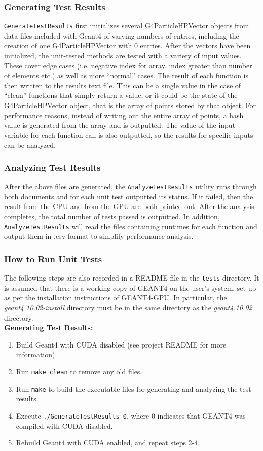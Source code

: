\documentclass[12pt]{article}
\begin{document}
\subsubsection{Generating Test Results}
\texttt{GenerateTestResults} first initializes several G4ParticleHPVector objects from data files included with Geant4 of varying numbers of entries, including the creation of one G4ParticleHPVector with 0 entries. After the vectors have been initialized, the unit-tested methods are tested with a variety of input values. These cover edge cases (i.e. negative index for array, index greater than number of elements etc.) as well as more ``normal'' cases. The result of each function is then written to the results text file. This can be a single value in the case of ``clean'' functions that simply return a value, or it could be the state of the G4ParticleHPVector object, that is the array of points stored by that object. For performance reasons, instead of writing out the entire array of points, a hash value is generated from the array and is outputted. The value of the input variable for each function call is also outputted, so the results for specific inputs can be analyzed.

\subsubsection{Analyzing Test Results}
After the above files are generated, the \texttt{AnalyzeTestResults} utility runs through both documents and for each unit test outputted its status. If it failed, then the result from the CPU and from the GPU are both printed out. After the analysis completes, the total number of tests passed is outputted. In addition, \texttt{AnalyzeTestResults} will read the files containing runtimes for each function and output them in .csv format to simplify performance analysis.

\subsubsection{How to Run Unit Tests}
The following steps are also recorded in a README file in the \texttt{tests} directory. It is assumed that there is a working copy of GEANT4 on the user's system, set up as per the installation instructions of GEANT4-GPU. In particular, the \emph{geant4.10.02-install} directory must be in the same directory as the \emph{geant4.10.02} directory.\\

\textbf{Generating Test Results:}
\begin{enumerate}
\item Build Geant4 with CUDA disabled (see project README for more information).
\item Run \texttt{make clean} to remove any old files.
\item Run \texttt{make} to build the executable files for generating and analyzing the test results.
\item Execute \texttt{./GenerateTestResults 0}, where 0 indicates that GEANT4 was compiled with CUDA disabled.
\item Rebuild Geant4 with CUDA enabled, and repeat steps 2-4.
\end{enumerate}
\end{document}
